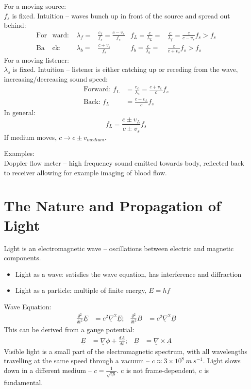 \documentclass[a4paper, 11pt, normalem]{report}
\begin{document}
For a moving source: \\
$f_{s}$ is fixed.
Intuition -- waves bunch up in front of the source and spread out behind:
\begin{align}
    \text{For}&\text{ward: } & \lambda_{f} =& \frac{c_{f}}{f_{s}} = \frac{c - v_{s}}{f_{s}} & f_{L} = \frac{c}{\lambda_{L}} =& \frac{c}{\lambda_{f}} = \frac{c}{c - v_{s}}f_{s} > f_{s} \\
    \text{Ba}&\text{ck: } & \lambda_{b} =& \frac{c + v_{s}}{f_{s}} & f_{b} = \frac{c}{\lambda_{b}} =& \frac{c}{c + v_{s}}f_{s} > f_{s}
\end{align}
For a moving listener: \\
$\lambda_{s}$ is fixed.
Intuition -- listener is either catching up or receding from the wave, increasing/decreasing sound speed:
\begin{align}
    \text{Forward: } f_{L} &= \frac{c_{L}}{\lambda_{s}} = \frac{c + v_{L}}{c}f_{s} \\
    \text{Back: } f_{L} &= \frac{c - v_{L}}{c}f_{s}
\end{align}
In general:
\begin{equation}
    f_{L} = \frac{c \pm v_{L}}{c \pm v_{s}}f_{s}
\end{equation}
If medium moves, $c \rightarrow c \pm v_{medium}$.

Examples: \\
Doppler flow meter -- high frequency sound emitted towards body, reflected back to receiver allowing for example imaging of blood flow.

\section{The Nature and Propagation of Light}
Light is an electromagnetic wave -- oscillations between electric and magnetic components.
\begin{itemize}
    \item Light as a wave: satisfies the wave equation, has interference and diffraction
    \item Light as a particle: multiple of finite energy, $E = hf$
\end{itemize}
Wave Equation:
\begin{align}
    \frac{\delta^{2}}{\delta t^{2}}\underline{E} &= c^{2}\underline{\nabla}^{2}\underline{E};& \frac{\delta^{2}}{\delta t^{2}}B &= c^{2}\underline{\nabla}^{2}\underline{B}
\end{align}
This can be derived from a gauge potential:
\begin{align}
    \underline{E} &= \underline{\nabla}\phi + \frac{d\underline{A}}{dt};& \underline{B} &= \underline{\nabla}\times\underline{A}
\end{align}
Visible light is a small part of the electromagnetic spectrum, with all wavelengths travelling at the same speed through a vacuum -- $c \approx 3\times10^{8}\:m\:s^{-1}$.
Light slows down in a different medium -- $c = \frac{1}{\sqrt{\epsilon\mu}}$.
c is not frame-dependent, c is fundamental.
\end{document}
